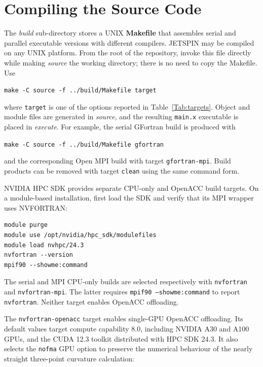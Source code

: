 
\section{Compiling the Source Code\label{sec:Compiling-the-Source}}

The \textit{build} sub-directory stores a UNIX \textbf{Makefile} that
assembles serial and parallel executable versions with different
compilers. JETSPIN may be compiled on any UNIX platform. From the root
of the repository, invoke this file directly while making \textit{source}
the working directory; there is no need to copy the Makefile. Use

\bigskip{}

\texttt{make -C source -f ../build/Makefile target}

\bigskip{}

where \texttt{target} is one of the options reported in
Table~\ref{Tab:targets}. Object and module files are generated in
\textit{source}, and the resulting \texttt{main.x} executable is placed
in \textit{execute}. For example, the serial GFortran build is produced
with

\bigskip{}

\texttt{make -C source -f ../build/Makefile gfortran}

\bigskip{}

and the corresponding Open MPI build with target
\texttt{gfortran-mpi}. Build products can be removed with target
\texttt{clean} using the same command form.

NVIDIA HPC SDK provides separate CPU-only and OpenACC build targets. On a
module-based installation, first load the SDK and verify that its MPI wrapper
uses NVFORTRAN:

\begin{verbatim}
module purge
module use /opt/nvidia/hpc_sdk/modulefiles
module load nvhpc/24.3
nvfortran --version
mpif90 --showme:command
\end{verbatim}

The serial and MPI CPU-only builds are selected respectively with
\texttt{nvfortran} and \texttt{nvfortran-mpi}. The latter requires
\texttt{mpif90 --showme:command} to report \texttt{nvfortran}.
Neither target enables OpenACC offloading.

The \texttt{nvfortran-openacc} target enables single-GPU OpenACC
offloading. Its default values target compute capability 8.0, including
NVIDIA A30 and A100 GPUs, and the CUDA 12.3 toolkit distributed with HPC SDK
24.3. It also selects the \texttt{nofma} GPU option to preserve the numerical
behaviour of the nearly straight three-point curvature calculation:

